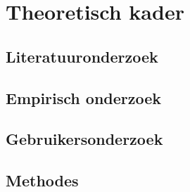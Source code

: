 \section{Theoretisch kader}
\subsection{Literatuuronderzoek}
\subsection{Empirisch onderzoek}
\subsection{Gebruikersonderzoek}
\subsection{Methodes}